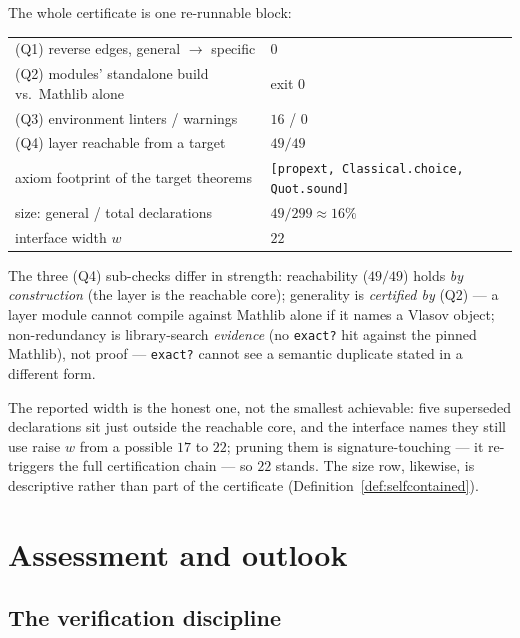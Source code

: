 \documentclass[11pt]{article}
\theoremstyle{plain}
\theoremstyle{definition}
\theoremstyle{remark}
\newcommand{\lean}[1]{\texttt{#1}}
\newcommand{\cleanfootprint}{\lean{[propext, Classical.choice, Quot.sound]}}
\begin{document}
\noindent The whole certificate is one re-runnable block:
\begin{center}\small
\begin{tabular}{ll}
\hline
(Q1) reverse edges, general $\to$ specific & $0$ \\
(Q2) modules' standalone build vs.\ Mathlib alone & exit $0$ \\
(Q3) environment linters / warnings & $16$ / $0$ \\
(Q4) layer reachable from a target & $49/49$ \\
axiom footprint of the target theorems & \cleanfootprint{} \\
size: general / total declarations & $49/299 \approx 16\%$ \\
interface width $w$ & $22$ \\
\hline
\end{tabular}
\end{center}

\noindent The three (Q4) sub-checks differ in strength: reachability ($49/49$)
holds \emph{by construction} (the layer is the reachable core); generality is
\emph{certified by} (Q2) --- a layer module cannot compile against Mathlib alone if
it names a Vlasov object; non-redundancy is library-search \emph{evidence} (no
\lean{exact?} hit against the pinned Mathlib), not proof --- \lean{exact?} cannot
see a semantic duplicate stated in a different form.

The reported width is the honest one, not the smallest achievable: five superseded
declarations sit just outside the reachable core, and the interface names they still
use raise $w$ from a possible $17$ to $22$; pruning them is signature-touching ---
it re-triggers the full certification chain --- so $22$ stands. The size row,
likewise, is descriptive rather than part of the certificate (Definition~\ref{def:selfcontained}).

\section{Assessment and outlook}\label{sec:assessment}

\subsection{The verification discipline}\label{sec:discipline}
\end{document}
